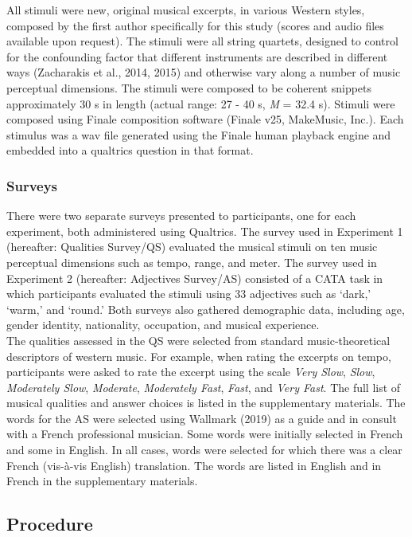 \documentclass[
  english,
  man,floatsintext]{apa6}
\begin{document}
All stimuli were new, original musical excerpts, in various Western styles, composed by the first author specifically for this study (scores and audio files available upon request). The stimuli were all string quartets, designed to control for the confounding factor that different instruments are described in different ways (Zacharakis et al., 2014, 2015) and otherwise vary along a number of music perceptual dimensions. The stimuli were composed to be coherent snippets approximately 30 s in length (actual range: 27 - 40 s, \emph{M} = 32.4 s). Stimuli were composed using Finale composition software (Finale v25, MakeMusic, Inc.). Each stimulus was a wav file generated using the Finale human playback engine and embedded into a qualtrics question in that format.

\hypertarget{surveys}{%
\subsubsection{Surveys}\label{surveys}}

There were two separate surveys presented to participants, one for each experiment, both administered using Qualtrics. The survey used in Experiment 1 (hereafter: Qualities Survey/QS) evaluated the musical stimuli on ten music perceptual dimensions such as tempo, range, and meter. The survey used in Experiment 2 (hereafter: Adjectives Survey/AS) consisted of a CATA task in which participants evaluated the stimuli using 33 adjectives such as `dark,' `warm,' and `round.' Both surveys also gathered demographic data, including age, gender identity, nationality, occupation, and musical experience.\\
The qualities assessed in the QS were selected from standard music-theoretical descriptors of western music. For example, when rating the excerpts on tempo, participants were asked to rate the excerpt using the scale \emph{Very Slow}, \emph{Slow}, \emph{Moderately Slow}, \emph{Moderate}, \emph{Moderately Fast}, \emph{Fast}, and \emph{Very Fast}. The full list of musical qualities and answer choices is listed in the supplementary materials. The words for the AS were selected using Wallmark (2019) as a guide and in consult with a French professional musician. Some words were initially selected in French and some in English. In all cases, words were selected for which there was a clear French (vis-à-vis English) translation. The words are listed in English and in French in the supplementary materials.

\hypertarget{procedure}{%
\subsection{Procedure}\label{procedure}}
\end{document}
